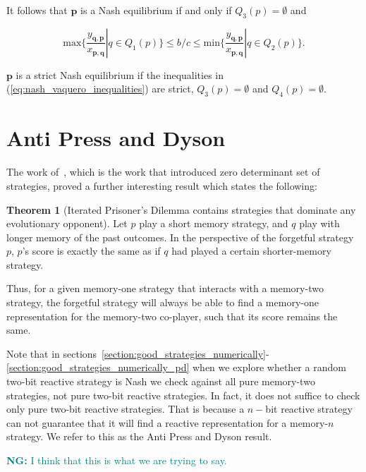 \documentclass{article}
\theoremstyle{definition}
\newtheorem{theorem}{Theorem}[section]
\newcommand{\nikoleta}[1]{\textcolor{teal}{{\bf NG:} #1}}
\begin{document}
It follows that \(\mathbf{p}\) is a Nash equilibrium if and only if \(Q_3(p) = \emptyset\)
and

\begin{equation}\label{eq:nash_vaquero_inequalities}
  \text{max}\{ \frac{y_{\mathbf{q}, \mathbf{p}}}{x_{\mathbf{p}, \mathbf{q}}} | q \in Q_1(p) \} \leq b / c  \leq \text{min}\{\frac{y_{\mathbf{q}, \mathbf{p}}}{x_{\mathbf{p}, \mathbf{q}}} | q \in Q_2(p) \}.
\end{equation}

\(\mathbf{p}\) is a strict Nash equilibrium if the inequalities in
(\ref{eq:nash_vaquero_inequalities}) are strict, \(Q_3(p) = \emptyset\) and
\(Q_4(p) = \emptyset\).

\section{Anti Press and Dyson}

The work of~\citep{press:PNAS:2012}, which is the work that introduced
zero determinant set of strategies, proved a further interesting result which
states the following:

\begin{theorem}[Iterated Prisoner's Dilemma contains strategies that dominate any evolutionary opponent]
  Let \(p\) play a short memory strategy, and \(q\) play with longer memory of
  the past outcomes. In the perspective of the forgetful strategy \(p\), \(p\)'s
  score is exactly the same as if \(q\) had played a certain shorter-memory
  strategy.
\end{theorem}

Thus, for a given memory-one strategy that interacts with a memory-two strategy,
the forgetful strategy will always be able to find a memory-one representation
for the memory-two co-player, such that its score remains the same.

Note that in sections~\ref{section:good_strategies_numerically}-
\ref{section:good_strategies_numerically_pd} when we explore whether a random
two-bit reactive strategy is Nash we check against all pure memory-two
strategies, not pure two-bit reactive strategies. In fact, it does not
suffice to check only pure two-bit reactive strategies.
That is because a \(n-\)bit reactive strategy can not guarantee that it will
find a reactive representation for a memory-\(n\) strategy. We refer to this
as the Anti Press and Dyson result.

\nikoleta{I think that this is what we are trying to say.}
\end{document}

